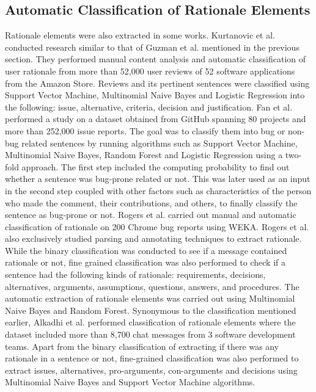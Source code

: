 \documentclass[a4paper,12pt,twoside]{report}
\begin{document}
\subsection{Automatic Classification of Rationale Elements}
Rationale elements were also extracted in some works. Kurtanovic et al.\cite{Kurtanovic2017} conducted research similar to that of Guzman et al.\cite{Guzman2017} mentioned in the previous section. They performed manual content analysis and automatic classification of user rationale from more than 52,000 user reviews of 52 software applications from the Amazon Store. Reviews and its pertinent sentences were classified using Support Vector Machine, Multinomial Naive Bayes and Logistic Regression into the following: issue, alternative, criteria, decision and justification.  
\newline \newline
Fan et al.\cite{Fan2017} performed a study on a dataset obtained from GitHub spanning 80 projects and more than 252,000 issue reports. The goal was to classify them into bug or non-bug related sentences by running algorithms such as Support Vector Machine, Multinomial Naive Bayes, Random Forest and Logistic Regression using a two-fold approach. The first step included the computing probability to find out whether a sentence was bug-prone related or not. This was later used as an input in the second step coupled with other factors such as characteristics of the person who made the comment, their contributions, and others, to finally classify the sentence as bug-prone or not. 
\newline \newline
Rogers et al.\cite{Rogers2014} carried out manual and automatic classification of rationale on 200 Chrome bug reports using \acs{WEKA}. Rogers et al.\cite{Rogers2012} also exclusively studied parsing and annotating techniques to extract rationale. While the binary classification was conducted to see if a message contained rationale or not, fine grained classification was also performed to check if a sentence had the following kinds of rationale: requirements, decisions, alternatives, arguments, assumptions, questions, answers, and procedures. The automatic extraction of rationale elements was carried out using Multinomial Naive Bayes and Random Forest. 
\newline \newline
Synonymous to the classification mentioned earlier, Alkadhi et al.\cite{Alkadhi2017} performed classification of rationale elements where the dataset included more than 8,700 chat messages from 3 software development teams. Apart from the binary classification of extracting if there was any rationale in a sentence or not, fine-grained classification was also performed to extract issues, alternatives, pro-arguments, con-arguments and decisions using Multinomial Naive Bayes and Support Vector Machine algorithms. 
\end{document}
